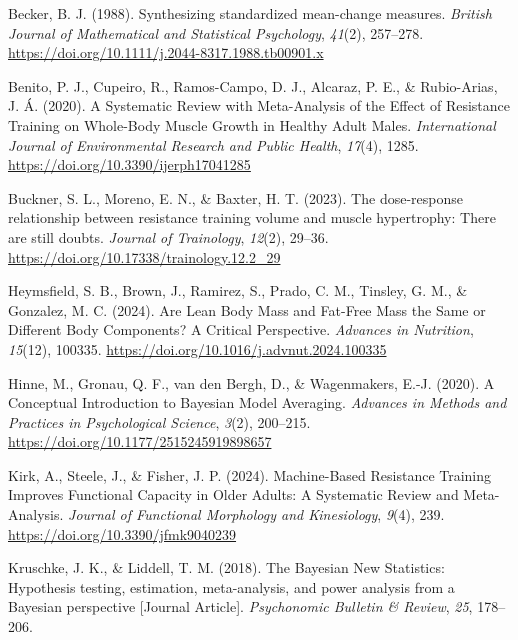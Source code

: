 \documentclass[
]{article}
\newlength{\cslhangindent}
\newenvironment{CSLReferences}[2] %
 {\begin{list}{}{%
  \setlength{\itemindent}{0pt}
  \setlength{\leftmargin}{0pt}
  \setlength{\parsep}{0pt}
  \ifodd #1
   \setlength{\leftmargin}{\cslhangindent}
   \setlength{\itemindent}{-1\cslhangindent}
  \fi
  \setlength{\itemsep}{#2\baselineskip}}}
 {\end{list}}
\begin{document}
\begin{CSLReferences}{1}{0}
Becker, B. J. (1988). Synthesizing standardized mean-change measures.
\emph{British Journal of Mathematical and Statistical Psychology},
\emph{41}(2), 257--278.
\url{https://doi.org/10.1111/j.2044-8317.1988.tb00901.x}

Benito, P. J., Cupeiro, R., Ramos-Campo, D. J., Alcaraz, P. E., \&
Rubio-Arias, J. Á. (2020). A {Systematic Review} with {Meta-Analysis} of
the {Effect} of {Resistance Training} on {Whole-Body Muscle Growth} in
{Healthy Adult Males}. \emph{International Journal of Environmental
Research and Public Health}, \emph{17}(4), 1285.
\url{https://doi.org/10.3390/ijerph17041285}

Buckner, S. L., Moreno, E. N., \& Baxter, H. T. (2023). The
dose-response relationship between resistance training volume and muscle
hypertrophy: {There} are still doubts. \emph{Journal of Trainology},
\emph{12}(2), 29--36. \url{https://doi.org/10.17338/trainology.12.2_29}

Heymsfield, S. B., Brown, J., Ramirez, S., Prado, C. M., Tinsley, G. M.,
\& Gonzalez, M. C. (2024). Are {Lean Body Mass} and {Fat-Free Mass} the
{Same} or {Different Body Components}? {A Critical Perspective}.
\emph{Advances in Nutrition}, \emph{15}(12), 100335.
\url{https://doi.org/10.1016/j.advnut.2024.100335}

{Hinne, M., Gronau, Q. F., van den Bergh, D., \& Wagenmakers, E.-J.}
(2020). A {Conceptual Introduction} to {Bayesian Model Averaging}.
\emph{Advances in Methods and Practices in Psychological Science},
\emph{3}(2), 200--215. \url{https://doi.org/10.1177/2515245919898657}

Kirk, A., Steele, J., \& Fisher, J. P. (2024). Machine-{Based Resistance
Training Improves Functional Capacity} in {Older Adults}: {A Systematic
Review} and {Meta-Analysis}. \emph{Journal of Functional Morphology and
Kinesiology}, \emph{9}(4), 239.
\url{https://doi.org/10.3390/jfmk9040239}

Kruschke, J. K., \& Liddell, T. M. (2018). The {Bayesian New
Statistics}: {Hypothesis} testing, estimation, meta-analysis, and power
analysis from a {Bayesian} perspective {[}Journal Article{]}.
\emph{Psychonomic Bulletin \& Review}, \emph{25}, 178--206.


\end{CSLReferences}
\end{document}
